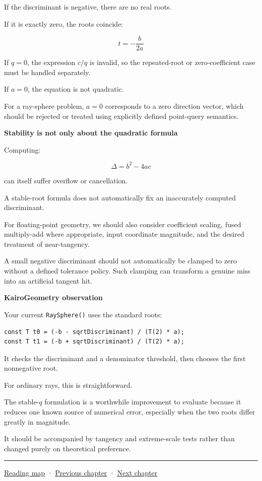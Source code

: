 If the discriminant is negative, there are no real roots.

If it is exactly zero, the roots coincide:

\[
t=-\frac b{2a}
\]

If \(q=0\), the expression \(c/q\) is invalid, so the repeated-root or zero-coefficient case must be handled separately.

If \(a=0\), the equation is not quadratic.

For a ray-sphere problem, \(a=0\) corresponds to a zero direction vector, which should be rejected or treated using explicitly defined point-query semantics.

\textbf{Stability is not only about the quadratic formula}

Computing:

\[
\Delta=b^2-4ac
\]

can itself suffer overflow or cancellation.

A stable-root formula does not automatically fix an inaccurately computed discriminant.

For floating-point geometry, we should also consider coefficient scaling, fused multiply-add where appropriate, input coordinate magnitude, and the desired treatment of near-tangency.

A small negative discriminant should not automatically be clamped to zero without a defined tolerance policy. Such clamping can transform a genuine miss into an artificial tangent hit.

\textbf{KairoGeometry observation}

Your current \texttt{RaySphere()} uses the standard roots:

\begin{verbatim}
const T t0 = (-b - sqrtDiscriminant) / (T(2) * a);
const T t1 = (-b + sqrtDiscriminant) / (T(2) * a);
\end{verbatim}

It checks the discriminant and a denominator threshold, then chooses the first nonnegative root.

For ordinary rays, this is straightforward.

The stable-\(q\) formulation is a worthwhile improvement to evaluate because it reduces one known source of numerical error, especially when the two roots differ greatly in magnitude.

It should be accompanied by tangency and extreme-scale tests rather than changed purely on theoretical preference.

\begin{center}\rule{0.5\linewidth}{0.5pt}\end{center}

\hyperref[volume-reading-map]{Reading map} · \hyperref[04-visual-computing-ii-ch022-convex-support-mapping-and-distance]{Previous chapter} · \hyperref[04-visual-computing-ii-ch024-raytriangle-intersection]{Next chapter}
